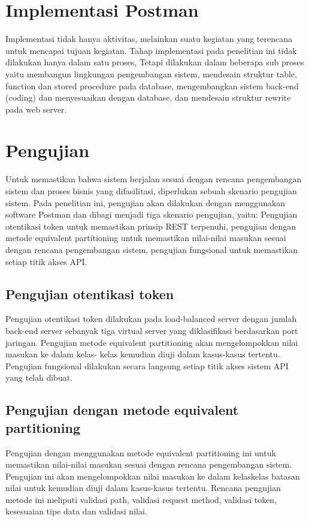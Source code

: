\documentclass[12pt,a4paper]{article}
\begin{document}
\section{Implementasi Postman}
Implementasi tidak hanya aktivitas, melainkan suatu kegiatan yang terencana untuk mencapai
tujuan kegiatan. Tahap implementasi pada penelitian ini tidak dilakukan hanya dalam satu proses,
Tetapi dilakukan dalam beberapa sub proses yaitu membangun lingkungan pengembangan sistem, 
mendesain struktur table, function dan stored procedure pada database, mengembangkan sistem back-end (coding) 
dan menyesuaikan dengan database, dan mendesain struktur rewrite pada web server. 

\section{Pengujian}
Untuk memastikan bahwa sistem berjalan sesuai dengan rencana pengembangan sistem dan proses bisnis yang difasilitasi, diperlukan sebuah skenario pengujian sistem. Pada penelitian ini, pengujian akan dilakukan dengan menggunakan software Postman dan dibagi menjadi tiga skenario pengujian, yaitu: Pengujian otentikasi token untuk memastikan prinsip REST terpenuhi, pengujian dengan metode equivalent partitioning untuk memastikan nilai-nilai masukan sesuai dengan rencana pengembangan sistem, pengujian fungsional untuk memastikan setiap titik akses API.

\subsection{Pengujian otentikasi token}
Pengujian  otentikasi token dilakukan pada load-balanced server dengan jumlah back-end server sebanyak tiga virtual server yang diklasifikasi berdasarkan port jaringan. Pengujian  metode equivalent partitioning akan mengelompokkan nilai masukan ke dalam kelas- kelas kemudian diuji dalam kasus-kasus tertentu. Pengujian fungsional dilakukan secara langsung setiap titik akses sistem API yang telah dibuat. 

\subsection {Pengujian dengan metode equivalent partitioning}
Pengujian dengan menggunakan metode equivalent partitioning ini untuk memastikan nilai-nilai masukan sesuai dengan rencana pengembangan sistem. Pengujian ini akan mengelompokkan nilai masukan ke dalam kelaskelas batasan nilai untuk kemudian diuji dalam kasus-kasus tertentu. Rencana pengujian metode ini meliputi validasi path, validasi request method, validasi token, kesesuaian tipe data dan validasi nilai.
\end{document}
